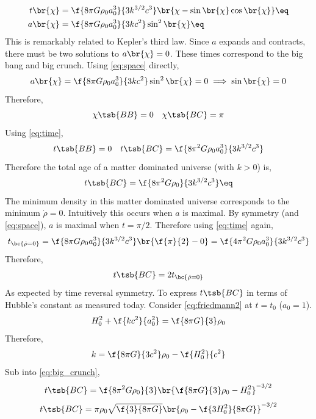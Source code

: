 \documentclass{article}
\begin{document}
\begin{align*}
t\br{\chi} &= \f{8 \pi G\rho_0a_0^3}{3k^{3/2}c^3}\br{\chi - \sin\br{\chi}\cos\br{\chi}} \eq \label{eq:time} \\
a\br{\chi} &= \f{8 \pi G\rho_0a_0^3}{3kc^2} \sin^2\br{\chi}  \eq \label{eq:space}
\end{align*}
This is remarkably related to Kepler's third law. Since $a$ expands and contracts, there must be two solutions to $a\br{\chi} = 0$. These times correspond to the big bang and big crunch. Using \cref{eq:space} directly,
\[ a\br{\chi} = \f{8 \pi G\rho_0a_0^3}{3kc^2} \sin^2\br{\chi} = 0 \implies \sin\br{\chi} = 0 \]
Therefore,
\[ \chi\tsb{BB} = 0 \quad \chi\tsb{BC} = \pi \]
Using \cref{eq:time},
\[ t\tsb{BB} = 0 \quad t\tsb{BC} = \f{8 \pi^2 G\rho_0a_0^3}{3k^{3/2}c^3} \]
Therefore the total age of a matter dominated universe (with $k >0$) is,
\[ t\tsb{BC} = \f{8 \pi^2 G\rho_0}{3k^{3/2}c^3} \eq \label{eq:big_crunch}\]
The minimum density in this matter dominated universe corresponds to the minimum $\dot \rho = 0$. Intuitively this occurs when $a$ is maximal. By symmetry (and \cref{eq:space}), $a$ is maximal when $t = \pi /2$. Therefore using \cref{eq:time} again,
\[ t_{\bc{\dot \rho = 0}} = \f{8 \pi G\rho_0a_0^3}{3k^{3/2}c^3}\br{\f{\pi}{2} - 0} = \f{4 \pi^2 G\rho_0a_0^3}{3k^{3/2}c^3} \]
Therefore,
\[ t\tsb{BC} = 2 t_{\bc{\dot \rho = 0}} \]
As expected by time reversal symmetry. To express $t\tsb{BC}$ in terms of Hubble's constant as measured today. Consider \cref{eq:friedmann2} at $t= t_0$ ($a_0 = 1$).
\[ H_0^2 + \f{kc^2}{a_0^2} = \f{8 \pi G}{3}\rho_0 \]
Therefore,
\[ k = \f{8 \pi G}{3c^2}\rho_0 - \f{H_0^2}{c^2} \]
Sub into \cref{eq:big_crunch},
\[ t\tsb{BC} = \f{8 \pi^2 G\rho_0}{3}\br{\f{8 \pi G}{3}\rho_0 - H_0^2}^{-3/2}\]
\[ t\tsb{BC} = \pi \rho_0\sqrt{\f{3}{8 \pi G}}\br{\rho_0 - \f{3H_0^2}{8 \pi G}}^{-3/2}\]
\end{document}
